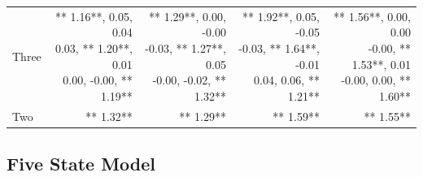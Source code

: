 \documentclass[12pt,PhD,twoside,openright]{muthesis}
\begin{document}
\begin{table}[!h]
\begin{tabular}[t]{l>{\ttfamily}r>{\ttfamily}r>{\ttfamily}r>{\ttfamily}r}
\hspace{1em}Three & \makecell[l]{** 1.16**,  0.05,  0.04\\  0.03, ** 1.20**,  0.01\\  0.00, -0.00, ** 1.19**} & \makecell[l]{** 1.29**,  0.00, -0.00\\ -0.03, ** 1.27**,  0.05\\ -0.00, -0.02, ** 1.32**} & \makecell[l]{** 1.92**,  0.05, -0.05\\ -0.03, ** 1.64**, -0.01\\  0.04,  0.06, ** 1.21**} & \makecell[l]{** 1.56**,  0.00,  0.00\\ -0.00, ** 1.53**,  0.01\\ -0.00,  0.00, ** 1.60**}\\
\hspace{1em}Two & ** 1.32** & ** 1.29** & ** 1.59** & ** 1.55**\\
\bottomrule
\end{tabular}
\end{table}
\hypertarget{five-state-model}{%
\subsection{Five State Model}\label{five-state-model}}
\end{document}
